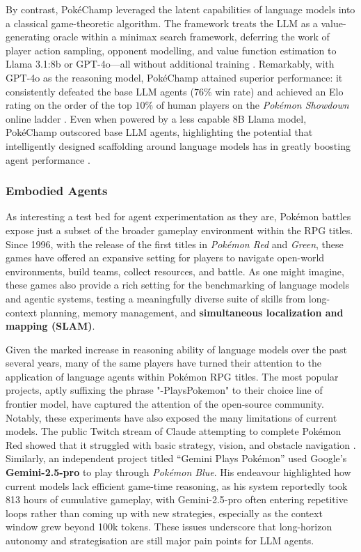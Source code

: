 \documentclass[11pt]{article}
\begin{document}
By contrast, PokéChamp \citep{karten2025pokechamp} leveraged the latent capabilities of language models into a classical game-theoretic algorithm. The framework treats the LLM as a value-generating oracle within a minimax search framework, deferring the work of player action sampling, opponent modelling, and value function estimation to Llama 3.1:8b or GPT-4o—all without additional training \citep{karten2025pokechamp}. Remarkably, with GPT-4o as the reasoning model, PokéChamp attained superior performance: it consistently defeated the base LLM agents ($76\%$ win rate) and achieved an Elo rating on the order of the top $10\%$ of human players on the \textit{Pokémon Showdown} online ladder  \citep{karten2025pokechamp}. Even when powered by a less capable 8B Llama model, PokéChamp outscored base LLM agents, highlighting the potential that intelligently designed scaffolding around language models has in greatly boosting agent performance \citep{karten2025pokechamp}. 

\subsubsection{Embodied Agents}

As interesting a test bed for agent experimentation as they are, Pokémon battles expose just a subset of the broader gameplay environment within the RPG titles. Since 1996, with the release of the first titles in \textit{Pokémon Red} and \textit{Green}, these games have offered an expansive setting for players to navigate open-world environments, build teams, collect resources, and battle. As one might imagine, these games also provide a rich setting for the benchmarking of language models and agentic systems, testing a meaningfully diverse suite of skills from long-context planning, memory management, and \textbf{simultaneous localization and mapping (SLAM)}.    

Given the marked increase in reasoning ability of language models over the past several years, many of the same players have turned their attention to the application of language agents within Pokémon RPG titles. The most popular projects, aptly suffixing the phrase "-PlaysPokemon" to their choice line of frontier model, have captured the attention of the open-source community. Notably, these experiments have also exposed the many limitations of current models. The public Twitch stream of Claude attempting to complete Pokémon Red showed that it struggled with basic strategy, vision, and obstacle navigation \citep{holt2025claude}. Similarly, an independent project titled “Gemini Plays Pokémon” used Google’s \textbf{Gemini-2.5-pro} to play through \textit{Pokémon Blue}. His endeavour highlighted how current models lack efficient game-time reasoning, as his system reportedly took 813 hours of cumulative gameplay, with Gemini-2.5-pro often entering repetitive loops rather than coming up with new strategies, especially as the context window grew beyond 100k tokens. These issues underscore that long-horizon autonomy and strategisation are still major pain points for LLM agents. 
\end{document}
